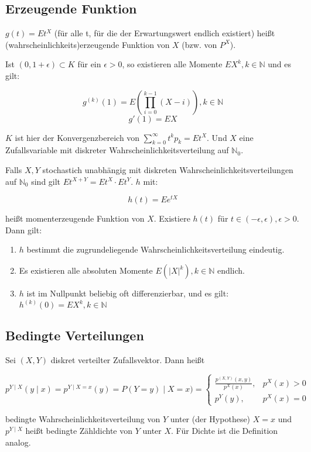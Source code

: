 \documentclass{scrartcl}%
\begin{document}
\subsection{Erzeugende Funktion}
$g(t) = Et^X$ (für alle t, für die der Erwartungswert endlich existiert) heißt (wahrscheinlichkeits)erzeugende Funktion von $X$ (bzw. von $P^X$).

Ist $(0,1+\epsilon) \subset K$ für ein $\epsilon > 0$, so existieren alle Momente $EX^k, k\in \mathbb{N}$ und es gilt:

\[g^{(k)} (1) = E(\prod\limits_{i=0}^{k-1} (X-i)), k \in \mathbb{N}\]
\[g'(1) = EX\]

$K$ ist hier der Konvergenzbereich von $\sum_{k=0}^\infty t^kp_k = Et^X$. Und $X$ eine Zufallsvariable mit diskreter Wahrscheinlichkeitsverteilung auf $\mathbb{N}_0$.

Falls $X,Y$ stochastich unabhängig mit diskreten Wahrscheinlichkeitsverteilungen auf $\mathbb{N}_0$ sind gilt $Et^{X+Y} = Et^X \cdot Et^Y$. $h$ mit:

\[h(t) = Ee^{tX}\]

heißt momenterzeugende Funktion von $X$. Existiere $h(t)$ für $t \in (-\epsilon, \epsilon), \epsilon >0$. Dann gilt:

\begin{enumerate}
	\item{$h$ bestimmt die zugrundeliegende Wahrscheinlichkeitsverteilung eindeutig.}
	\item{Es existieren alle absoluten Momente $E(\vert X\vert^k), k \in \mathbb{N}$ endlich.}
	\item{$h$ ist im Nullpunkt beliebig oft differenzierbar, und es gilt: $h^{(k)} (0) = EX^k, k\in \mathbb{N}$}
\end{enumerate}

\subsection{Bedingte Verteilungen}
Sei $(X,Y)$ diskret verteilter Zufallsvektor. Dann heißt

\[p^{Y\mid X} (y\mid x) = p^{Y\mid X=x} (y) = P(Y = y)\mid X = x) = \begin{cases}\frac{p^{(X,Y)} (x,y)}{p^X (x)}, &p^X (x) > 0\\ p^Y (y), &p^X(x) = 0 \end{cases}\]

bedingte Wahrscheinlichkeitsverteilung von $Y$ unter (der Hypothese) $X = x$ und $p^{Y\mid X}$ heißt bedingte Zähldichte von $Y$ unter $X$. Für Dichte ist die Definition analog.
\end{document}

